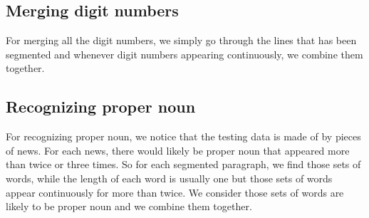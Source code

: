\documentclass{article}
\begin{document}
\subsection{Merging digit numbers}
For merging all the digit numbers, we simply go through the lines that has been segmented and whenever digit numbers appearing continuously, we combine them together.

\subsection{Recognizing proper noun}
For recognizing proper noun, we notice that the testing data is made of by pieces of news. For each news, there would likely be proper noun that appeared more than twice or three times. So for each segmented paragraph, we find those sets of words, while the length of each word is usually one but those sets of words appear continuously for more than twice. We consider those sets of words are likely to be proper noun and we combine them together.
\end{document}
